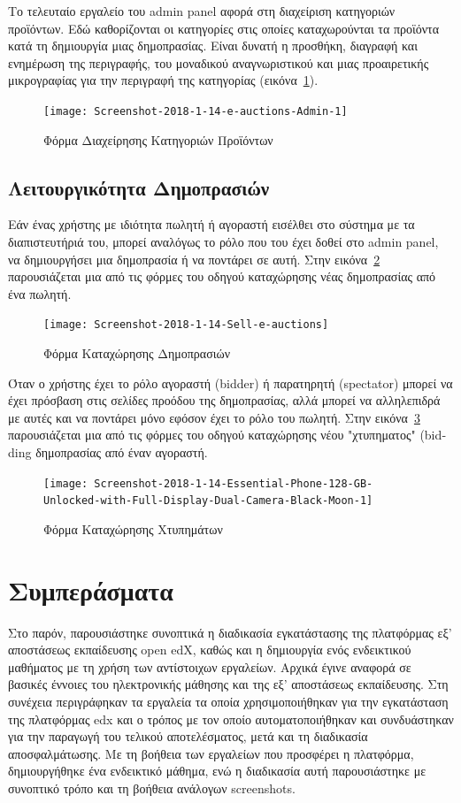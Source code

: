 \documentclass[12pt]{report}
\begin{document}
Το τελευταίο εργαλείο του \textlatin{admin panel} αφορά στη διαχείριση κατηγοριών προϊόντων. Εδώ καθορίζονται οι κατηγορίες στις οποίες καταχωρούνται τα προϊόντα κατά τη δημιουργία μιας δημοπρασίας. Είναι δυνατή η προσθήκη, διαγραφή και ενημέρωση της περιγραφής, του μοναδικού αναγνωριστικού και μιας προαιρετικής μικρογραφίας για την περιγραφή της κατηγορίας (εικόνα~\ref{fig:category_admin}).
\begin{figure}[H]
\centering
\texttt{[image: Screenshot-2018-1-14-e-auctions-Admin-1]}
\caption{Φόρμα Διαχείρησης Κατηγοριών Προϊόντων}
\label{fig:category_admin}
\end{figure}

\subsection{Λειτουργικότητα Δημοπρασιών}
Εάν ένας χρήστης με ιδιότητα πωλητή ή αγοραστή εισέλθει στο σύστημα με τα διαπιστευτήριά του, μπορεί αναλόγως το ρόλο που του έχει δοθεί στο \textlatin{admin panel}, να δημιουργήσει μια δημοπρασία ή να ποντάρει σε αυτή. Στην εικόνα~\ref{fig:auction_new} παρουσιάζεται μια από τις φόρμες του οδηγού καταχώρησης νέας δημοπρασίας από ένα πωλητή.
\begin{figure}[H]
\centering
\texttt{[image: Screenshot-2018-1-14-Sell-e-auctions]}
\caption{Φόρμα Καταχώρησης Δημοπρασιών}
\label{fig:auction_new}
\end{figure}

Όταν ο χρήστης έχει το ρόλο αγοραστή (\textlatin{bidder}) ή παρατηρητή (\textlatin{spectator}) μπορεί να έχει πρόσβαση στις σελίδες προόδου της δημοπρασίας, αλλά μπορεί να αλληλεπιδρά με αυτές και να ποντάρει μόνο εφόσον έχει το ρόλο του πωλητή. Στην εικόνα~\ref{fig:auction_bid} παρουσιάζεται μια από τις φόρμες του οδηγού καταχώρησης νέου "χτυπηματος" (\textlatin{bidding} δημοπρασίας από έναν αγοραστή.
\begin{figure}[H]
\centering
\texttt{[image: Screenshot-2018-1-14-Essential-Phone-128-GB-Unlocked-with-Full-Display-Dual-Camera-Black-Moon-1]}
\caption{Φόρμα Καταχώρησης Χτυπημάτων}
\label{fig:auction_bid}
\end{figure}

\section{Συμπεράσματα}
Στο παρόν, παρουσιάστηκε συνοπτικά η διαδικασία εγκατάστασης της πλατφόρμας εξ' αποστάσεως εκπαίδευσης \textlatin{open edX}, καθώς και η δημιουργία ενός ενδεικτικού μαθήματος με τη χρήση των αντίστοιχων εργαλείων. Αρχικά έγινε αναφορά σε βασικές έννοιες του ηλεκτρονικής μάθησης και της εξ' αποστάσεως εκπαίδευσης. Στη συνέχεια περιγράφηκαν τα εργαλεία τα οποία χρησιμοποιήθηκαν για την εγκατάσταση της πλατφόρμας \textlatin{edx} και ο τρόπος με τον οποίο αυτοματοποιήθηκαν και συνδυάστηκαν για την παραγωγή του τελικού αποτελέσματος, μετά και τη διαδικασία αποσφαλμάτωσης. Με τη βοήθεια των εργαλείων που προσφέρει η πλατφόρμα, δημιουργήθηκε ένα ενδεικτικό μάθημα, ενώ η διαδικασία αυτή παρουσιάστηκε με συνοπτικό τρόπο και τη βοήθεια ανάλογων \textlatin{screenshots}.
\end{document}
